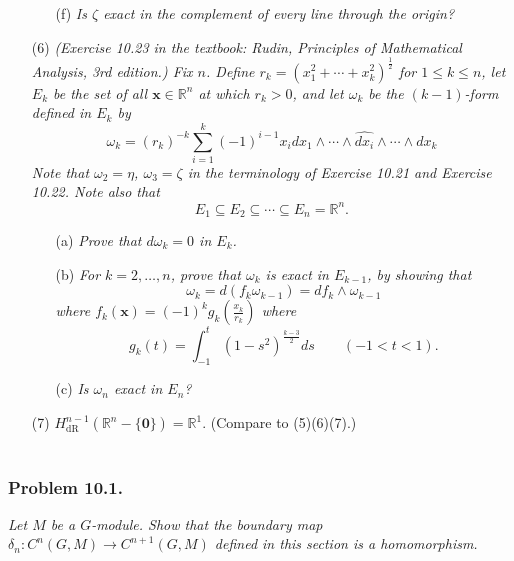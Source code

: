 \documentclass{article}
\begin{document}
\begin{enumerate}
\begin{enumerate}
  \item[(f)]
    \emph{Is $\zeta$ exact in the complement of every line through the origin?}
  \end{enumerate}

\item[(6)]
  \emph{(Exercise 10.23 in the textbook:
  Rudin, Principles of Mathematical Analysis, 3rd edition.)
Fix $n$.
Define $r_k = (x_1^2+\cdots+x_k^2)^{\frac{1}{2}}$ for $1 \leq k \leq n$,
let $E_k$ be the set of all $\mathbf{x} \in \mathbb{R}^n$ at which $r_k > 0$,
and let $\omega_k$ be the $(k-1)$-form defined in $E_k$ by
\[
  \omega_k
  = (r_k)^{-k}
    \sum_{i=1}^{k} (-1)^{i-1} x_i
    dx_1 \wedge \cdots \wedge \widehat{dx_i} \wedge \cdots \wedge dx_k
\]
Note that $\omega_2 = \eta$, $\omega_3 = \zeta$ in the terminology of
Exercise 10.21 and Exercise 10.22.
Note also that}
\[
  E_1 \subseteq E_2 \subseteq \cdots \subseteq E_n = \mathbb{R}^n.
\]
\begin{enumerate}
\item[(a)]
  \emph{Prove that $d\omega_k = 0$ in $E_k$.}

\item[(b)]
  \emph{For $k=2,\ldots,n$, prove that $\omega_k$ is exact in $E_{k-1}$,
  by showing that
  \[
    \omega_k = d(f_k\omega_{k-1}) = df_k \wedge \omega_{k-1}
  \]
  where $f_k(\mathbf{x}) = (-1)^k g_k\left( \frac{x_k}{r_k} \right)$
  where}
  \[
    g_k(t) = \int_{-1}^{t} (1-s^2)^{\frac{k-3}{2}} ds
    \qquad
    (-1 < t < 1).
  \]

\item[(c)]
  \emph{Is $\omega_n$ exact in $E_n$?}
\end{enumerate}

\item[(7)]
  $H^{n-1}_{\mathrm{dR}}(\mathbb{R}^n-\{\mathbf{0}\}) = \mathbb{R}^1$.
  (Compare to (5)(6)(7).) \\\\
\end{enumerate}






\subsubsection*{Problem 10.1.}
\emph{Let $M$ be a $G$-module.
Show that the boundary map $\delta_n: C^{n}(G,M) \to C^{n+1}(G,M)$
defined in this section is a homomorphism.} \\
\end{document}

